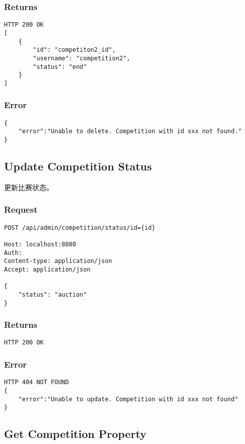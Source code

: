 \documentclass{article}
\begin{document}
\subsubsection*{Returns}
\begin{lstlisting}
HTTP 200 OK
[
	{
	    "id": "competiton2_id",
	    "username": "competition2",
	    "status": "end"
	}
]
\end{lstlisting}

\subsubsection*{Error}
\begin{lstlisting}
{
    "error":"Unable to delete. Competition with id xxx not found."
}
\end{lstlisting}

\subsection{Update Competition Status}

更新比赛状态。

\subsubsection*{Request}
\begin{lstlisting}
POST /api/admin/competition/status/id={id}

Host: localhost:8080
Auth:
Content-type: application/json
Accept: application/json

{
	"status": "auction"
}
\end{lstlisting}

\subsubsection*{Returns}
\begin{lstlisting}
HTTP 200 OK
\end{lstlisting}

\subsubsection*{Error}
\begin{lstlisting}
HTTP 404 NOT FOUND
{
    "error":"Unable to update. Competition with id xxx not found"
}
\end{lstlisting}


\subsection{Get Competition Property}
\end{document}

